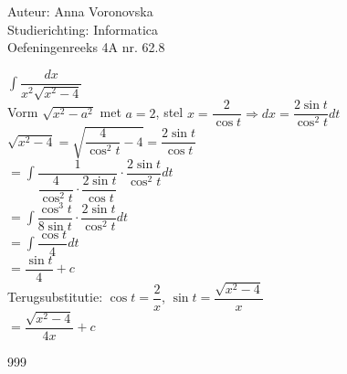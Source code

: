 \documentclass[a4paper]{article}
\begin{document}
  
\noindent \large Auteur: Anna Voronovska \\
\noindent \large Studierichting: Informatica\\
\noindent \large Oefeningenreeks 4A nr. 62.8\\

\medskip

\normalsize

$\displaystyle\int\dfrac{dx}{x^2\sqrt{x^2-4}}$\\

Vorm $\sqrt{x^2-a^2}$ met $a=2$, stel $x = \dfrac{2}{\cos t} \Rightarrow dx = \dfrac{2\sin t}{\cos^2 t}dt$\\

$\sqrt{x^2-4} = \sqrt{\dfrac{4}{\cos^2 t}-4} = \dfrac{2\sin t}{\cos t}$\\

$= \displaystyle\int \dfrac{1}{\dfrac{4}{\cos^2 t} \cdot \dfrac{2\sin t}{\cos t}} \cdot \dfrac{2\sin t}{\cos^2 t}dt$\\

$= \displaystyle\int \dfrac{\cos^3 t}{8\sin t} \cdot \dfrac{2\sin t}{\cos^2 t}dt$\\

$= \displaystyle\int \dfrac{\cos t}{4}dt$\\

$= \dfrac{\sin t}{4} + c$\\

Terugsubstitutie: $\cos t = \dfrac{2}{x}$, $\sin t = \dfrac{\sqrt{x^2-4}}{x}$\\

$= \dfrac{\sqrt{x^2-4}}{4x} + c$

\begin{thebibliography}{999}
\end{thebibliography}
\end{document}
